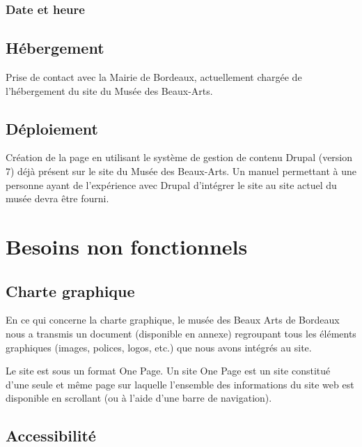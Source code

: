 \documentclass[11pt]{report}
\begin{document}
\subsubsection{Date et heure}

\subsection*{Hébergement}
Prise de contact avec la Mairie de Bordeaux, actuellement chargée de
l'hébergement du site du Musée des Beaux-Arts.

\subsection*{Déploiement}
Création de la page en utilisant le système de gestion de contenu Drupal
(version 7) déjà présent sur le site du Musée des Beaux-Arts.
Un manuel permettant à une personne ayant de l'expérience avec Drupal
d'intégrer le site au site actuel du musée devra être fourni.


\section{Besoins non fonctionnels}

\subsection*{Charte graphique}

En ce qui concerne la charte graphique, le musée des Beaux Arts de Bordeaux nous a transmis un document (disponible en annexe) regroupant tous les éléments graphiques (images, polices, logos, etc.) que nous avons intégrés au site.

Le site est sous un format One Page. Un site One Page est un site constitué
d'une seule et même page sur laquelle l'ensemble des informations du site web
est disponible en scrollant (ou à l'aide d'une barre de navigation).

\subsection*{Accessibilité}
\end{document}
